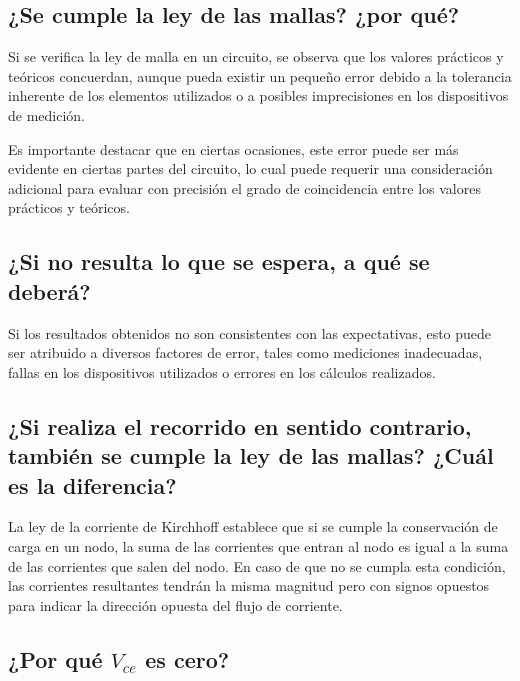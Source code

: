 \documentclass[twocolumn, 12pt]{article}
\begin{document}
\subsection{¿Se cumple la ley de las mallas? ¿por qué?}

Si se verifica la ley de malla en un circuito, se observa
que los valores prácticos y teóricos concuerdan, aunque
pueda existir un pequeño error debido a la tolerancia
inherente de los elementos utilizados o a posibles
imprecisiones en los dispositivos de medición.

Es importante destacar que en ciertas ocasiones, este error
puede ser más evidente en ciertas partes del circuito, lo
cual puede requerir una consideración adicional para
evaluar con precisión el grado de coincidencia entre los
valores prácticos y teóricos.

\subsection{¿Si no resulta lo que se espera, a qué se deberá?}

Si los resultados obtenidos no son consistentes con las
expectativas, esto puede ser atribuido a diversos factores
de error, tales como mediciones inadecuadas, fallas en los
dispositivos utilizados o errores en los cálculos
realizados.

\subsection{¿Si realiza el recorrido en sentido contrario, también se cumple la ley de las mallas?
    ¿Cuál es la diferencia?}

La ley de la corriente de Kirchhoff establece que si se
cumple la conservación de carga en un nodo, la suma de las
corrientes que entran al nodo es igual a la suma de las
corrientes que salen del nodo. En caso de que no se cumpla
esta condición, las corrientes resultantes tendrán la misma
magnitud pero con signos opuestos para indicar la dirección
opuesta del flujo de corriente.

\subsection{¿Por qué $V_{ce}$ es cero?}
\end{document}
